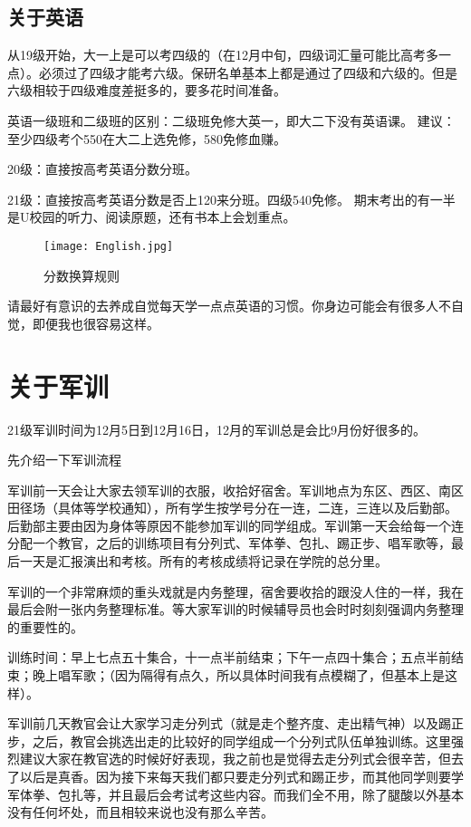 \documentclass{my_paper}
\begin{document}
\subsection{关于英语}
从19级开始，大一上是可以考四级的（在12月中旬，四级词汇量可能比高考多一点）。必须过了四级才能考六级。保研名单基本上都是通过了四级和六级的。但是六级相较于四级难度差挺多的，要多花时间准备。

英语一级班和二级班的区别：二级班免修大英一，即大二下没有英语课。
建议：至少四级考个550在大二上选免修，580免修血赚。

20级：直接按高考英语分数分班。

21级：直接按高考英语分数是否上120来分班。四级540免修。
期末考出的有一半是U校园的听力、阅读原题，还有书本上会划重点。

\begin{figure}[H]
	\centering
	\texttt{[image: English.jpg]}
	\caption{分数换算规则}
\end{figure} 

请最好有意识的去养成自觉每天学一点点英语的习惯。你身边可能会有很多人不自觉，即便我也很容易这样。

\section{关于军训}
21级军训时间为12月5日到12月16日，12月的军训总是会比9月份好很多的。

先介绍一下军训流程

军训前一天会让大家去领军训的衣服，收拾好宿舍。军训地点为东区、西区、南区田径场（具体等学校通知），所有学生按学号分在一连，二连，三连以及后勤部。后勤部主要由因为身体等原因不能参加军训的同学组成。军训第一天会给每一个连分配一个教官，之后的训练项目有分列式、军体拳、包扎、踢正步、唱军歌等，最后一天是汇报演出和考核。所有的考核成绩将记录在学院的总分里。

军训的一个非常麻烦的重头戏就是内务整理，宿舍要收拾的跟没人住的一样，我在最后会附一张内务整理标准。等大家军训的时候辅导员也会时时刻刻强调内务整理的重要性的。

训练时间：早上七点五十集合，十一点半前结束；下午一点四十集合；五点半前结束；晚上唱军歌；（因为隔得有点久，所以具体时间我有点模糊了，但基本上是这样）。

军训前几天教官会让大家学习走分列式（就是走个整齐度、走出精气神）以及踢正步，之后，教官会挑选出走的比较好的同学组成一个分列式队伍单独训练。这里强烈建议大家在教官选的时候好好表现，我之前也是觉得去走分列式会很辛苦，但去了以后是真香。因为接下来每天我们都只要走分列式和踢正步，而其他同学则要学军体拳、包扎等，并且最后会考试考这些内容。而我们全不用，除了腿酸以外基本没有任何坏处，而且相较来说也没有那么辛苦。
\end{document}
